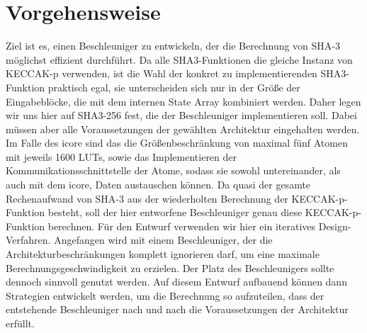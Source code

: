 \section{Vorgehensweise}
Ziel ist es, einen Beschleuniger zu entwickeln, der die Berechnung von SHA-3 möglichst effizient durchführt.
Da alle SHA3-Funktionen die gleiche Instanz von KECCAK-p verwenden, ist die Wahl der konkret zu implementierenden
SHA3-Funktion praktisch egal, sie unterscheiden sich nur in der Größe der Eingabeblöcke, die mit dem internen
State Array kombiniert werden. Daher legen wir uns hier auf SHA3-256 fest, die der Beschleuniger implementieren soll.
Dabei müssen aber alle Voraussetzungen der gewählten Architektur eingehalten werden. Im Falle des icore sind
das die Größenbeschränkung von maximal fünf Atomen mit jeweils 1600 LUTs, sowie das Implementieren der
Kommunikationsschnittstelle der Atome, sodass sie sowohl untereinander, als auch mit dem icore, Daten austauschen können.
Da quasi der gesamte Rechenaufwand von SHA-3 aus der wiederholten Berechnung der KECCAK-p-Funktion besteht,
soll der hier entworfene Beschleuniger genau diese KECCAK-p-Funktion berechnen.
Für den Entwurf verwenden wir hier ein iteratives Design-Verfahren. Angefangen wird mit einem Beschleuniger,
der die Architekturbeschränkungen komplett ignorieren darf, um eine maximale Berechnungsgeschwindigkeit zu erzielen.
Der Platz des Beschleunigers sollte dennoch sinnvoll genutzt werden. Auf diesem Entwurf aufbauend können dann
Strategien entwickelt werden, um die Berechnung so aufzuteilen, dass der entstehende Beschleuniger nach und nach die
Voraussetzungen der Architektur erfüllt.